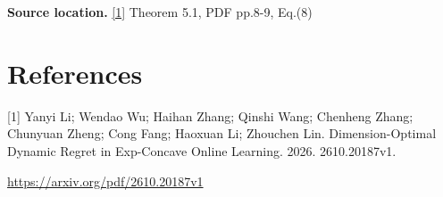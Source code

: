 \documentclass[10pt,a4paper]{article}
\begin{document}
\textbf{Source location.} \href{https://arxiv.org/pdf/2610.20187v1}{[1]} Theorem 5.1, PDF pp.8-9, Eq.(8)

\section{References}
[1] Yanyi Li; Wendao Wu; Haihan Zhang; Qinshi Wang; Chenheng Zhang; Chunyuan Zheng; Cong Fang; Haoxuan Li; Zhouchen Lin. Dimension-Optimal Dynamic Regret in Exp-Concave Online Learning. 2026. 2610.20187v1.

\url{https://arxiv.org/pdf/2610.20187v1}
\end{document}
